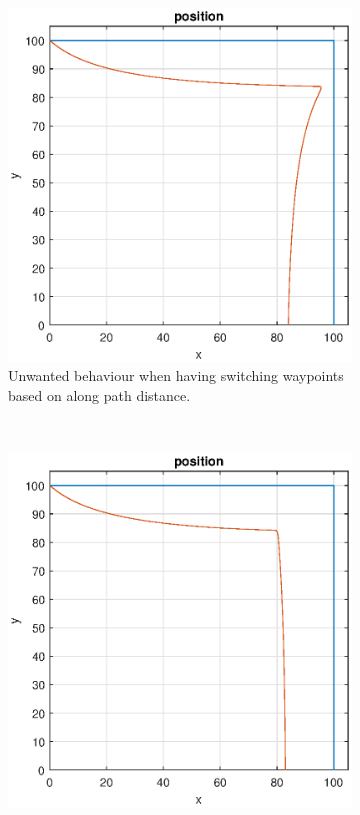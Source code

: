 \begin{figure}[t]
\centering
\begin{subfigure}[b]{.48\textwidth}
    \centering
    \includegraphics[width = \linewidth]{Figures/gammel_wp_switch}
    \caption{Unwanted behaviour when having switching waypoints based on along path distance. }
    \label{fig:Along_path_switch}
\end{subfigure}
\,
\begin{subfigure}[b]{.48\textwidth}
    \centering
    \includegraphics[width = \linewidth]{Figures/ny_wp_switch.eps}

\end{subfigure}
\end{figure}
